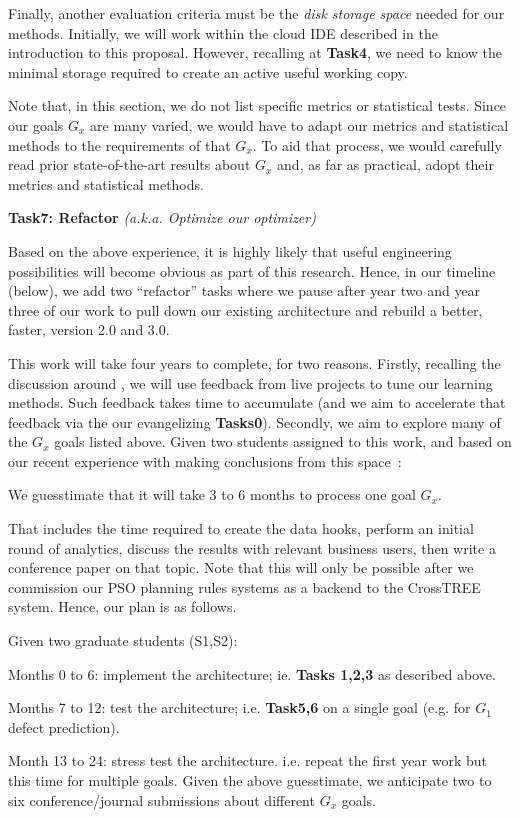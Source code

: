Finally, another evaluation criteria must be the {\em disk  storage space}
needed for our methods. Initially, we will work within the cloud IDE
described in the introduction to this proposal. However, recalling
at {\bf Task4}, we need to know the minimal storage required to create an active useful working
copy.

Note that, in this section, we do not list specific metrics or statistical tests. Since our goals $G_x$ are many varied, we would have to
adapt our metrics and statistical methods to the requirements of that $G_x$. To aid that process, we would carefully read prior state-of-the-art
results about $G_x$ and, as far as practical, adopt their metrics and statistical methods.


\noindent
{\bf Task7: Refactor } {\em (a.k.a. Optimize our optimizer)}

Based on the above experience, it is highly likely that useful engineering possibilities will become obvious as part of this research.
Hence, in our timeline (below), we add two ``refactor'' tasks where we pause after year two and year three of our work to pull down our existing architecture
and rebuild a better, faster, version 2.0 and 3.0.
 

This work  will take four years to complete, for two reasons.
Firstly, recalling the discussion around , we will use feedback from live projects to tune
our learning methods. Such feedback takes time to accumulate (and we aim to accelerate that feedback via
the our evangelizing {\bf Tasks0}). Secondly, we aim to explore many of the  $G_x$ goals listed above.
Given two students assigned to this work, and based on our recent experience with making conclusions
from this space~\cite{agrawal17hero,agrawal17time,rees2017better}:
\bi
\item
We guesstimate that it will
take 3 to 6 months to process one goal $G_x$.
\item
That includes the time required to create the data hooks, perform an initial round of analytics,
discuss the results with relevant business users, then write a conference paper on that topic.
\ei
Note that this will only be possible after we commission our PSO planning rules systems as a backend to
the CrossTREE system. Hence, our plan is as follows.


%



Given two graduate students (S1,S2):
\bi
\item Months 0 to 6: implement the architecture; ie. {\bf Tasks 1,2,3} as described above.
\item Months 7 to 12: test the architecture; i.e. {\bf Task5,6} on a single goal (e.g.  for $G_1$ defect prediction).
\item Month 13 to 24: stress test the architecture. i.e. repeat   the first year work but this time for multiple goals.
         Given the above guesstimate, we anticipate two to six conference/journal submissions about different $G_x$ goals.
         
